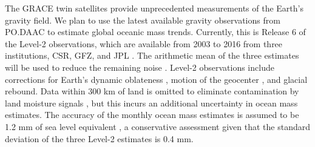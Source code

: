 \documentclass[authoryear,round,12pt]{article}
\begin{document}



The GRACE  twin satellites provide unprecedented measurements of the Earth's gravity field. We plan to use the latest available gravity observations from PO.DAAC to estimate global oceanic mass trends. Currently, this is Release 6 of the Level-2 observations, which are available from 2003 to 2016 from three institutions, CSR, GFZ, and JPL \citep[data available at,][]{PODAAC--2019:GRACE}. The arithmetic mean of the three estimates will be used to reduce the remaining noise \citep{Sakumura-Bettadpur-2014:Ensemble}. Level-2 observations include corrections for Earth's dynamic oblateness \citep[e.g.,][]{Dickey-Marcus-2005:Interannual}, motion of the geocenter \citep[e.g.,][]{Swenson-Chambers-2008:Estimating}, and glacial rebound. Data within 300 km of land is omitted to eliminate contamination by land moisture signals \citep[e.g.,][]{Llovel-Willis-2014:Deep}, but this incurs an additional uncertainty in ocean mass estimates. The accuracy
of the monthly ocean mass estimates is assumed to be 1.2 mm of sea level equivalent \citep{Johnson-Chambers-2013:Ocean}, a conservative assessment given that the standard deviation of the three Level-2 estimates is 0.4 mm.
\end{document}
